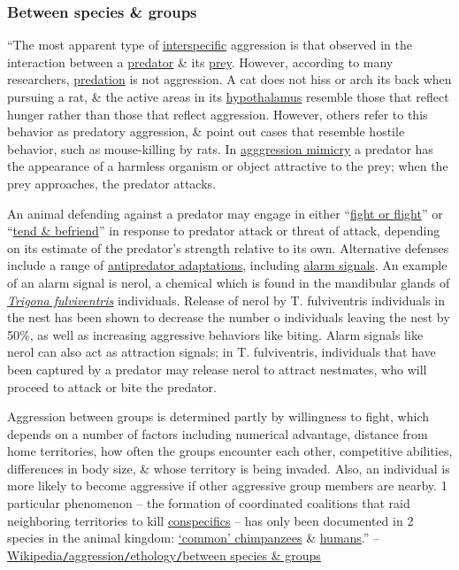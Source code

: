 \documentclass[oneside]{book}
\numberwithin{equation}{section}
\begin{document}
\subsubsection{Between species \& groups}
``The most apparent type of \href{https://en.wikipedia.org/wiki/Interspecific}{interspecific} aggression is that observed in the interaction between a \href{https://en.wikipedia.org/wiki/Predator}{predator} \& its \href{https://en.wikipedia.org/wiki/Prey}{prey}. However, according to many researchers, \href{https://en.wikipedia.org/wiki/Predation}{predation} is not aggression. A cat does not hiss or arch its back when pursuing a rat, \& the active areas in its \href{https://en.wikipedia.org/wiki/Hypothalamus}{hypothalamus} resemble those that reflect hunger rather than those that reflect aggression. However, others refer to this behavior as predatory aggression, \& point out cases that resemble hostile behavior, such as mouse-killing by rats. In \href{https://en.wikipedia.org/wiki/Aggressive_mimicry}{agggression mimicry} a predator has the appearance of a harmless organism or object attractive to the prey; when the prey approaches, the predator attacks.

An animal defending against a predator may engage in either ``\href{https://en.wikipedia.org/wiki/Fight-or-flight_response}{fight or flight}'' or ``\href{https://en.wikipedia.org/wiki/Tend_and_befriend}{tend \& befriend}'' in response to predator attack or threat of attack, depending on its estimate of the predator's strength relative to its own. Alternative defenses include a range of \href{https://en.wikipedia.org/wiki/Antipredator_adaptation}{antipredator adaptations}, including \href{https://en.wikipedia.org/wiki/Alarm_signal}{alarm signals}. An example of an alarm signal is nerol, a chemical which is found in the mandibular glands of \href{https://en.wikipedia.org/wiki/Trigona_fulviventris}{\textit{Trigona fulviventris}} individuals. Release of nerol by T. fulviventris individuals in the nest has been shown to decrease the number o individuals leaving the nest by 50\%, as well as increasing aggressive behaviors like biting. Alarm signals like nerol can also act as attraction signals; in T. fulviventris, individuals that have been captured by a predator may release nerol to attract nestmates, who will proceed to attack or bite the predator.

Aggression between groups is determined partly by willingness to fight, which depends on a number of factors including numerical advantage, distance from home territories, how often the groups encounter each other, competitive abilities, differences in body size, \& whose territory is being invaded. Also, an individual is more likely to become aggressive if other aggressive group members are nearby. 1 particular phenomenon -- the formation of coordinated coalitions that raid neighboring territories to kill \href{https://en.wikipedia.org/wiki/Conspecific}{conspecifics} -- has only been documented in 2 species in the animal kingdom: \href{https://en.wikipedia.org/wiki/Common_chimpanzee}{`common' chimpanzees} \& \href{https://en.wikipedia.org/wiki/Humans}{humans}.'' -- \href{https://en.wikipedia.org/wiki/Aggression#Between_species_and_groups}{Wikipedia\texttt{/}aggression\texttt{/}ethology\texttt{/}between species \& groups}
\end{document}
